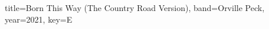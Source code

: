 \documentclass{skrul-leadsheet}
\begin{document}
\begin{song}[transpose-capo=true]{title={Born This Way (The Country Road Version)}, band={Orville Peck}, year={2021}, key={E}}



\end{song}
\end{document}
